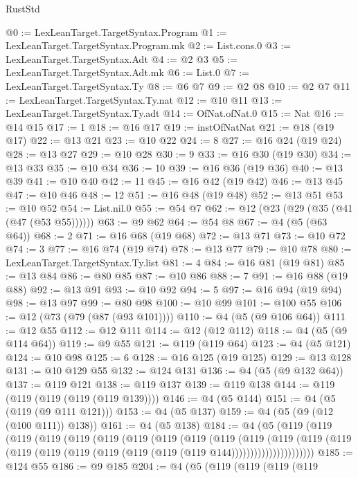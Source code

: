 \begin{lexlean}{RustStd}
\begin{coremodule}
{\begin{coremodule}
{{{{{{{{{{{{{{{{{{{{{{{{{{{{{{{{{{{{{{{{{{{{{{{{{{{{{{{{{{{{{{{{{{@0 := LexLeanTarget.TargetSyntax.Program
@1 := LexLeanTarget.TargetSyntax.Program.mk
@2 := List.cons.{0}
@3 := LexLeanTarget.TargetSyntax.Adt
@4 := @2 @3
@5 := LexLeanTarget.TargetSyntax.Adt.mk
@6 := List.{0}
@7 := LexLeanTarget.TargetSyntax.Ty
@8 := @6 @7
@9 := @2 @8
@10 := @2 @7
@11 := LexLeanTarget.TargetSyntax.Ty.nat
@12 := @10 @11
@13 := LexLeanTarget.TargetSyntax.Ty.adt
@14 := OfNat.ofNat.{0}
@15 := Nat
@16 := @14 @15
@17 := 1
@18 := @16 @17
@19 := instOfNatNat
@21 := @18 (@19 @17)
@22 := @13 @21
@23 := @10 @22
@24 := 8
@27 := @16 @24 (@19 @24)
@28 := @13 @27
@29 := @10 @28
@30 := 9
@33 := @16 @30 (@19 @30)
@34 := @13 @33
@35 := @10 @34
@36 := 10
@39 := @16 @36 (@19 @36)
@40 := @13 @39
@41 := @10 @40
@42 := 11
@45 := @16 @42 (@19 @42)
@46 := @13 @45
@47 := @10 @46
@48 := 12
@51 := @16 @48 (@19 @48)
@52 := @13 @51
@53 := @10 @52
@54 := List.nil.{0}
@55 := @54 @7
@62 := @12 (@23 (@29 (@35 (@41 (@47 (@53 @55))))))
@63 := @9 @62
@64 := @54 @8
@67 := @4 (@5 (@63 @64))
@68 := 2
@71 := @16 @68 (@19 @68)
@72 := @13 @71
@73 := @10 @72
@74 := 3
@77 := @16 @74 (@19 @74)
@78 := @13 @77
@79 := @10 @78
@80 := LexLeanTarget.TargetSyntax.Ty.list
@81 := 4
@84 := @16 @81 (@19 @81)
@85 := @13 @84
@86 := @80 @85
@87 := @10 @86
@88 := 7
@91 := @16 @88 (@19 @88)
@92 := @13 @91
@93 := @10 @92
@94 := 5
@97 := @16 @94 (@19 @94)
@98 := @13 @97
@99 := @80 @98
@100 := @10 @99
@101 := @100 @55
@106 := @12 (@73 (@79 (@87 (@93 @101))))
@110 := @4 (@5 (@9 @106 @64))
@111 := @12 @55
@112 := @12 @111
@114 := @12 (@12 @112)
@118 := @4 (@5 (@9 @114 @64))
@119 := @9 @55
@121 := @119 (@119 @64)
@123 := @4 (@5 @121)
@124 := @10 @98
@125 := 6
@128 := @16 @125 (@19 @125)
@129 := @13 @128
@131 := @10 @129 @55
@132 := @124 @131
@136 := @4 (@5 (@9 @132 @64))
@137 := @119 @121
@138 := @119 @137
@139 := @119 @138
@144 := @119 (@119 (@119 (@119 (@119 @139))))
@146 := @4 (@5 @144)
@151 := @4 (@5 (@119 (@9 @111 @121)))
@153 := @4 (@5 @137)
@159 := @4 (@5 (@9 (@12 (@100 @111)) @138))
@161 := @4 (@5 @138)
@184 := @4
    (@5
      (@119
        (@119
          (@119
            (@119
              (@119
                (@119
                  (@119
                    (@119
                      (@119
                        (@119
                          (@119
                            (@119
                              (@119
                                (@119
                                  (@119
                                    (@119 (@119 (@119 (@119 (@119 (@119 @144))))))))))))))))))))))
@185 := @124 @55
@186 := @9 @185
@204 := @4
    (@5
      (@119
        (@119
          (@119
            (@119
}}}}}}}}}}}}}}}}}}}}}}}}}}}}}}}}}}}}}}}}}}}}}}}}}}}}}}}}}}}}}}}}}}
\end{coremodule}}
\end{coremodule}
\end{lexlean}
